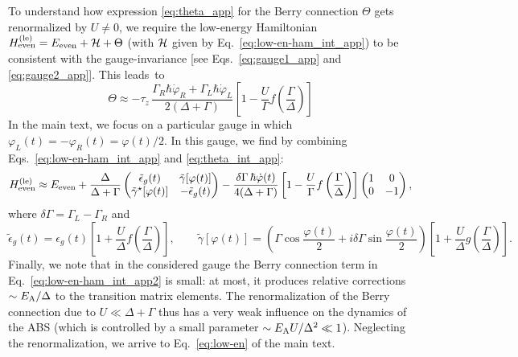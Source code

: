 \documentclass[aps,reprint,longbibliography, prb]{revtex4-2}
\begin{document}
To understand how expression \eqref{eq:theta_app} for the Berry connection $\Theta$ gets renormalized by $U \neq 0$, we require the low-energy Hamiltonian $H^{\rm (le)}_{\rm even} = E_{\rm even} + {\cal H} + \Theta$ (with ${\cal H}$ given by Eq.~\eqref{eq:low-en-ham_int_app}) to be consistent with the gauge-invariance [see Eqs.~\eqref{eq:gauge1_app} and \eqref{eq:gauge2_app}]. This leads~to 
\begin{equation}\label{eq:theta_int_app}
    \Theta \approx -\tau_z \, \frac{\Gamma_R \hbar\dot{\varphi}_R + \Gamma_L \hbar\dot{\varphi}_L}{2(\Delta + \Gamma)} \left[1 - \frac{U}{\Gamma} f\left(\frac{\Gamma}{\Delta}\right)\right]
\end{equation}
In the main text, we focus on a particular gauge in which $\varphi_L(t) = -\varphi_R(t) = \varphi(t) / 2$. In this gauge, we find by combining Eqs.~\eqref{eq:low-en-ham_int_app} and \eqref{eq:theta_int_app}:
\begin{equation}\label{eq:low-en-ham_int_app2}
    H_\mathrm{even}^{\mathrm{(le)}} \approx E_{\rm even} + \frac{\Delta}{\Delta + \Gamma}
    \begin{pmatrix}
    \tilde{\epsilon}_g(t) & \tilde{\gamma}[\varphi(t)] \\
    \tilde{\gamma}^\star[\varphi(t)]  & - \tilde{\epsilon}_g(t)
    \end{pmatrix}
    - \frac{\delta \Gamma\,\hbar\dot{\varphi}(t)}{4(\Delta + \Gamma)}\left[1 - \frac{U}{\Gamma} f\left(\frac{\Gamma}{\Delta}\right)\right] \begin{pmatrix}
        1 & 0 \\
        0 & -1
    \end{pmatrix},
\end{equation}
where $\delta \Gamma = \Gamma_L - \Gamma_R$ and
\begin{equation}
    \tilde{\epsilon}_g(t) = \epsilon_g(t) \left[1 + \frac{U}{\Delta} f\left(\frac{\Gamma}{\Delta}\right)\right],\quad\quad \tilde{\gamma}[\varphi(t)] =  \left(\Gamma \cos \frac{\varphi(t)}{2} + i\delta\Gamma \sin \frac{\varphi(t)}{2}\right) \left[1 + \frac{U}{\Delta} g\left(\frac{\Gamma}{\Delta}\right)\right].
\end{equation}
Finally, we note that in the considered gauge the Berry connection term in Eq.~\eqref{eq:low-en-ham_int_app2} is small: at most, it produces relative corrections $\sim E_{\rm A} / \Delta$ to the transition matrix elements. The renormalization of the Berry connection due to $U \ll \Delta + \Gamma$ thus has a very weak influence on the dynamics of the ABS (which is controlled by a small parameter $\sim E_{\rm A} U / \Delta^2 \ll 1$). Neglecting the renormalization, we arrive to Eq.~\eqref{eq:low-en} of the main text. 
\end{document}
